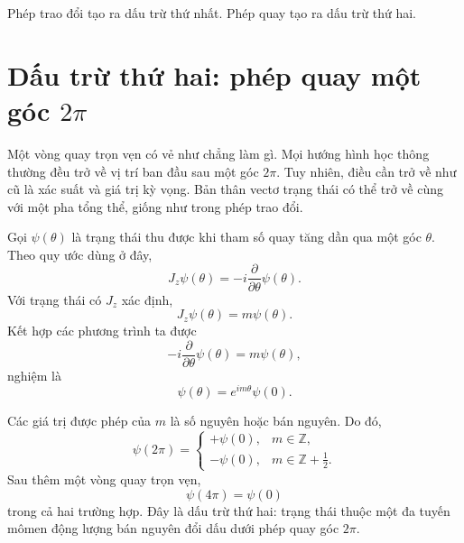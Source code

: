 Phép trao đổi tạo ra dấu trừ thứ nhất. Phép quay tạo ra dấu trừ thứ hai.

\section{Dấu trừ thứ hai: phép quay một góc \texorpdfstring{\(2\pi\)}{2 pi}}

Một vòng quay trọn vẹn có vẻ như chẳng làm gì. Mọi hướng hình học thông thường đều trở về vị trí ban đầu sau một góc \(2\pi\). Tuy nhiên, điều cần trở về như cũ là xác suất và giá trị kỳ vọng. Bản thân vectơ trạng thái có thể trở về cùng với một pha tổng thể, giống như trong phép trao đổi.

\begin{classroomqa}
\end{classroomqa}


Gọi \(\psi(\theta)\) là trạng thái thu được khi tham số quay tăng dần qua một góc \(\theta\). Theo quy ước dùng ở đây,
\begin{equation}
J_z\psi(\theta)
=
-i\frac{\partial}{\partial\theta}\psi(\theta).
\end{equation}
Với trạng thái có \(J_z\) xác định,
\begin{equation}
J_z\psi(\theta)=m\psi(\theta).
\end{equation}
Kết hợp các phương trình ta được
\begin{equation}
-i\frac{\partial}{\partial\theta}\psi(\theta)
=
m\psi(\theta),
\end{equation}
nghiệm là
\begin{equation}
\psi(\theta)=e^{im\theta}\psi(0).
\end{equation}

Các giá trị được phép của \(m\) là số nguyên hoặc bán nguyên. Do đó,
\begin{equation}
\psi(2\pi)
=
\begin{cases}
+\psi(0), & m\in\mathbb Z,\\[4pt]
-\psi(0), & m\in\mathbb Z+\tfrac12.
\end{cases}
\end{equation}
Sau thêm một vòng quay trọn vẹn,
\begin{equation}
\psi(4\pi)=\psi(0)
\end{equation}
trong cả hai trường hợp. Đây là dấu trừ thứ hai: trạng thái thuộc một đa tuyến mômen động lượng bán nguyên đổi dấu dưới phép quay góc \(2\pi\).


